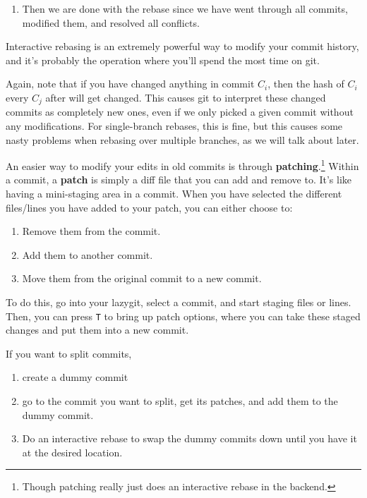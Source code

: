 \begin{definition}[Rebasing]
\begin{enumerate}
      \item Then we are done with the rebase since we have went through all commits, modified them, and resolved all conflicts. 
    \end{enumerate}
    Interactive rebasing is an extremely powerful way to modify your commit history, and it's probably the operation where you'll spend the most time on git. 
  \end{definition} 

  Again, note that if you have changed anything in commit $C_i$, then the hash of $C_i$ every $C_j$ after will get changed. This causes git to interpret these changed commits as completely new ones, even if we only picked a given commit without any modifications. For single-branch rebases, this is fine, but this causes some nasty problems when rebasing over multiple branches, as we will talk about later. 

  \begin{definition}[Patching]
    \label{def:patching}
    An easier way to modify your edits in old commits is through \textbf{patching}.\footnote{Though patching really just does an interactive rebase in the backend.} Within a commit, a \textbf{patch} is simply a diff file that you can add and remove to. It's like having a mini-staging area in a commit. When you have selected the different files/lines you have added to your patch, you can either choose to: 
    \begin{enumerate}
      \item Remove them from the commit. 
      \item Add them to another commit. 
      \item Move them from the original commit to a new commit. 
    \end{enumerate} 
    To do this, go into your lazygit, select a commit, and start staging files or lines. Then, you can press \texttt{T} to bring up patch options, where you can take these staged changes and put them into a new commit. 
  \end{definition}

  \begin{theorem}
    \label{thm:splitting-commits-into-two-different-commits}
    If you want to split commits, 
    \begin{enumerate}
      \item create a dummy commit 
      \item go to the commit you want to split, get its patches, and add them to the dummy commit. 
      \item Do an interactive rebase to swap the dummy commits down until you have it at the desired location. 
    \end{enumerate}
  \end{theorem} 

